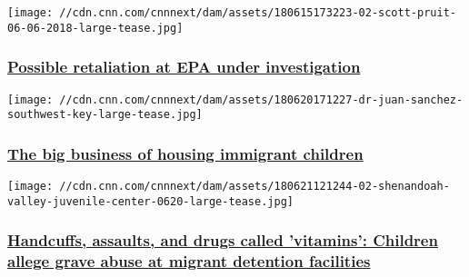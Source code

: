 \href{/2018/06/25/politics/pruitt-retaliation-investigation/index.html}{}

\texttt{[image: //cdn.cnn.com/cnnnext/dam/assets/180615173223-02-scott-pruit-06-06-2018-large-tease.jpg]}

\hypertarget{possible-retaliation-at-epa-under-investigation-}{%
\subsubsection{\texorpdfstring{\href{/2018/06/25/politics/pruitt-retaliation-investigation/index.html}{Possible
retaliation at EPA under investigation
}}{Possible retaliation at EPA under investigation }}\label{possible-retaliation-at-epa-under-investigation-}}

\href{/2018/06/21/us/southwest-key-migrant-housing-salary-invs/index.html}{}

\texttt{[image: //cdn.cnn.com/cnnnext/dam/assets/180620171227-dr-juan-sanchez-southwest-key-large-tease.jpg]}

\hypertarget{the-big-business-of-housing-immigrant-children}{%
\subsubsection{\texorpdfstring{\href{/2018/06/21/us/southwest-key-migrant-housing-salary-invs/index.html}{The
big business of housing immigrant
children}}{The big business of housing immigrant children}}\label{the-big-business-of-housing-immigrant-children}}

\href{/2018/06/21/us/undocumented-migrant-children-detention-facilities-abuse-invs/index.html}{}

\texttt{[image: //cdn.cnn.com/cnnnext/dam/assets/180621121244-02-shenandoah-valley-juvenile-center-0620-large-tease.jpg]}

\hypertarget{handcuffs-assaults-and-drugs-called-vitamins-children-allege-grave-abuse-at-migrant-detention-facilities}{%
\subsubsection{\texorpdfstring{\href{/2018/06/21/us/undocumented-migrant-children-detention-facilities-abuse-invs/index.html}{Handcuffs,
assaults, and drugs called 'vitamins': Children allege grave abuse at
migrant detention
facilities}}{Handcuffs, assaults, and drugs called 'vitamins': Children allege grave abuse at migrant detention facilities}}\label{handcuffs-assaults-and-drugs-called-vitamins-children-allege-grave-abuse-at-migrant-detention-facilities}}

